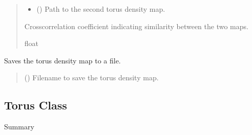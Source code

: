 \documentclass[letterpaper,10pt,english]{sphinxmanual}
\begin{document}
\begin{fulllineitems}
\begin{fulllineitems}
\begin{quote}
\begin{description}
\begin{itemize}
\item {} 
\sphinxAtStartPar
{} () \textendash{} Path to the second torus density map.

\end{itemize}

\sphinxAtStartPar
Cross\sphinxhyphen{}correlation coefficient indicating similarity between the two maps.

\sphinxAtStartPar
float

\end{description}\end{quote}

\end{fulllineitems}


\begin{fulllineitems}
\label{\detokenize{src:src.BagelFitter.BagelFitter.write_torusmap_to_file}}
\pysigstartsignatures
{}
\pysigstopsignatures
\sphinxAtStartPar
Saves the torus density map to a file.
\begin{quote}\begin{description}
\sphinxAtStartPar
{} () \textendash{} Filename to save the torus density map.

\end{description}\end{quote}

\end{fulllineitems}


\end{fulllineitems}



\subsection{Torus Class}
\label{\detokenize{src:module-src.Torus}}\label{\detokenize{src:torus-class}}
\sphinxAtStartPar
Summary
\end{document}
